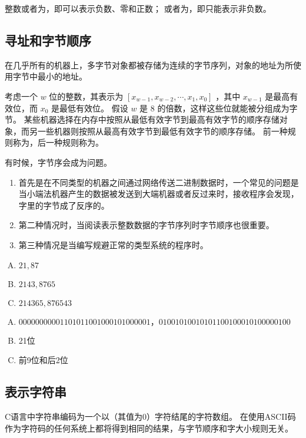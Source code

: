 {{        整数或者为，即可以表示负数、零和正数；
        或者为，即只能表示非负数。
    }

    \subsection{寻址和字节顺序}
    {
        在几乎所有的机器上，多字节对象都被存储为连续的字节序列，对象的地址为所使用字节中最小的地址。

        考虑一个 $w$ 位的整数，其表示为 $[x_{w - 1}, x_{w - 2}, \cdots, x_1, x_0]$ ，其中 $x_{w - 1}$ 是最高有效位，而 $x_0$ 是最低有效位。
        假设 $w$ 是 $8$ 的倍数，这样这些位就能被分组成为字节。
        某些机器选择在内存中按照从最低有效字节到最高有效字节的顺序存储对象，而另一些机器则按照从最高有效字节到最低有效字节的顺序存储。
        前一种规则称为，后一种规则称为。

        有时候，字节序会成为问题。

        \begin{enumerate}
            \item
            {
                首先是在不同类型的机器之间通过网络传送二进制数据时，一个常见的问题是当小端法机器产生的数据被发送到大端机器或者反过来时，接收程序会发现，字里的字节成了反序的。
            }
            \item
            {
                第二种情况时，当阅读表示整数数据的字节序列时字节顺序也很重要。
            }
            \item
            {
                第三种情况是当编写规避正常的类型系统的程序时。
            }
        \end{enumerate}

        \begin{practicec}
            \begin{enumerate}[A.]
                \item $21, 87$
                \item $2143, 8765$
                \item $214365, 876543$
            \end{enumerate}
        \end{practicec}

        \begin{practicec}
            \begin{enumerate}[A.]
                \item $0000 0000 0011 0101 1001 0001 0100 0001， 0100 1010 0101 0110 0100 0101 0000 0100$
                \item 21位
                \item 前9位和后2位
            \end{enumerate}
        \end{practicec}
    }

    \subsection{表示字符串}
    {
        C语言中字符串编码为一个以（其值为0）字符结尾的字符数组。
        在使用ASCII码作为字符码的任何系统上都将得到相同的结果，与字节顺序和字大小规则无关。
    }
}

